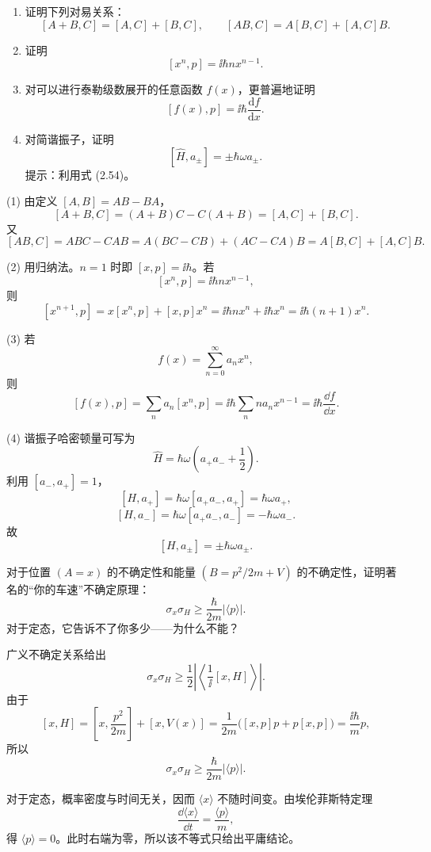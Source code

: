 \begin{question}
\begin{enumerate}
\item 证明下列对易关系：
\[
[A+B,C]=[A,C]+[B,C],\qquad [AB,C]=A[B,C]+[A,C]B.
\]
\item 证明
\[
[x^n,p]=\ii\hbar n x^{n-1}.
\]
\item 对可以进行泰勒级数展开的任意函数 $f(x)$，更普遍地证明
\[
[f(x),p]=\ii\hbar\frac{\mathrm df}{\mathrm dx}.
\tag{3.66}
\]
\item 对简谐振子，证明
\[
[\hat H,a_\pm]=\pm\hbar\omega a_\pm .
\tag{3.67}
\]
提示：利用式 (2.54)。
\end{enumerate}

\par\smallskip
{}

\end{question}
\begin{solution}
(1) 由定义 $[A,B]=AB-BA$，
\[
[A+B,C]=(A+B)C-C(A+B)=[A,C]+[B,C].
\]
又
\[
[AB,C]=ABC-CAB=A(BC-CB)+(AC-CA)B=A[B,C]+[A,C]B.
\]

(2) 用归纳法。$n=1$ 时即 $[x,p]=\ii\hbar$。若
\[
[x^n,p]=\ii\hbar n x^{n-1},
\]
则
\[
[x^{n+1},p]=x[x^n,p]+[x,p]x^n
=\ii\hbar n x^n+\ii\hbar x^n
=\ii\hbar(n+1)x^n.
\]

(3) 若
\[
f(x)=\sum_{n=0}^{\infty}a_nx^n,
\]
则
\[
[f(x),p]=\sum_n a_n[x^n,p]
=\ii\hbar\sum_n n a_nx^{n-1}
=\ii\hbar\frac{\dd f}{\dd x}.
\]

(4) 谐振子哈密顿量可写为
\[
\hat H=\hbar\omega\left(a_+a_-+\frac12\right).
\]
利用 $[a_-,a_+]=1$，
\[
[H,a_+]=\hbar\omega[a_+a_-,a_+]=\hbar\omega a_+,
\]
\[
[H,a_-]=\hbar\omega[a_+a_-,a_-]=-\hbar\omega a_-.
\]
故
\[
\boxed{[H,a_\pm]=\pm\hbar\omega a_\pm.}
\]
\end{solution}

\begin{question}
对于位置 $(A=x)$ 的不确定性和能量 $(B=p^2/2m+V)$ 的不确定性，证明著名的“你的车速”不确定原理：
\[
\sigma_x\sigma_H\geq \frac{\hbar}{2m}|\langle p\rangle|.
\]
对于定态，它告诉不了你多少——为什么不能？
\end{question}
\begin{solution}
广义不确定关系给出
\[
\sigma_x\sigma_H\ge \frac12\left|\left\langle\frac1\ii[x,H]\right\rangle\right|.
\]
由于
\[
[x,H]=\left[x,\frac{p^2}{2m}\right]+[x,V(x)]
=\frac1{2m}\bigl([x,p]p+p[x,p]\bigr)
=\frac{\ii\hbar}{m}p,
\]
所以
\[
\boxed{\sigma_x\sigma_H\ge \frac{\hbar}{2m}|\langle p\rangle|.}
\]

对于定态，概率密度与时间无关，因而 $\langle x\rangle$ 不随时间变。由埃伦菲斯特定理
\[
\frac{\dd\langle x\rangle}{\dd t}=\frac{\langle p\rangle}{m},
\]
得 $\langle p\rangle=0$。此时右端为零，所以该不等式只给出平庸结论。
\end{solution}

